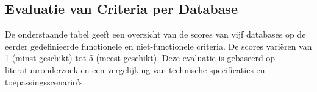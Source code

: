 \subsection{Evaluatie van Criteria per Database}
De onderstaande tabel geeft een overzicht van de scores van vijf databases op de eerder gedefinieerde functionele en niet-functionele criteria. De scores variëren van 1 (minst geschikt) tot 5 (meest geschikt). Deze evaluatie is gebaseerd op literatuuronderzoek en een vergelijking van technische specificaties en toepassingsscenario’s.

\begin{table}[h]
    \centering
    \caption{Scores van databases op functionele en niet-functionele criteria. \autocite{Mahmud2020, PostgreSQLDocumentation, CassandraDocumentation, RedisDocumentation, TimescaleDBDocumentation, MongoDBDocumentation}}
    \label{tab:database-scoring}
\end{table}

